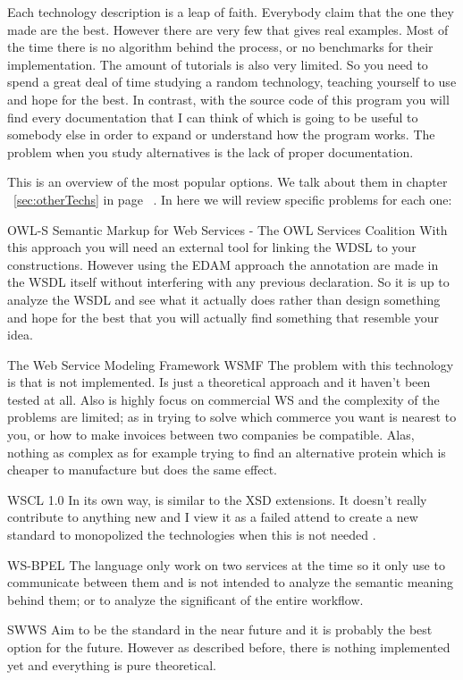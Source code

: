 \documentclass[a4paper,10pt]{article}
\begin{document}
  Each technology description is a leap of faith. Everybody claim that the one they made are the best. However there are very few that gives real examples. Most of the time there is no algorithm behind the process, or no benchmarks for their implementation. The amount of tutorials is also very limited. So you need to spend a great deal of time studying a random technology, teaching yourself to use and  hope for the best. In contrast, with the source code of this program you will find every documentation that I can think of which is going to be useful to somebody else in order to expand or understand how the program works. The problem when you study alternatives is the lack of proper documentation.\vspace{3 mm}

  This is an overview of the most popular options. We talk about them in chapter ~\ref{sec:otherTechs} in page ~\pageref{sec:otherTechs}. In here we will review specific problems for each one:\vspace{3 mm}

  \begin{description}
    \item OWL-S Semantic Markup for Web Services - The OWL Services Coalition 
    With this approach you will need an external tool for linking the WDSL to your constructions. However using the EDAM approach the annotation are made in the WSDL itself without interfering with any previous declaration. So it is up to analyze the WSDL and see what it actually does rather than design something and hope for the best that you will actually find something that resemble your idea.

    \item The Web Service Modeling Framework WSMF
    The problem with this technology is that is not implemented. Is just a theoretical approach and it haven't been tested at all. Also is highly focus on commercial WS and the complexity of the problems are limited; as in trying to solve which commerce you want is nearest to you, or how to make invoices between two companies be compatible. Alas, nothing as complex as for example trying to find an alternative protein which is cheaper to manufacture but does the same effect.

    \item WSCL 1.0
    In its own way, is similar to the XSD extensions. It doesn't really contribute to anything new and I view it as a failed attend to create a new standard to monopolized the technologies when this is not needed \cite{xkcd}.

    \item WS-BPEL
    The language only work on two services at the time so it only use to communicate between them and is not intended to analyze the semantic meaning behind them; or to analyze the significant of the entire workflow.

    \item SWWS
    Aim to be the standard in the near future and it is probably the best option for the future. However as described before, there is nothing implemented yet and everything is pure theoretical.

  \end{description}
\end{document}
